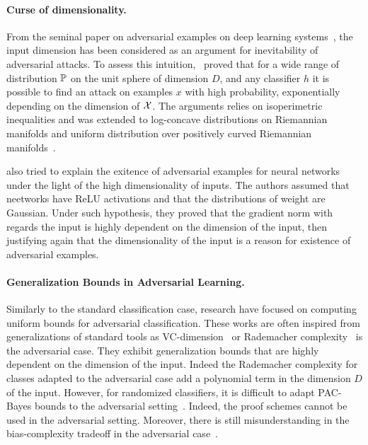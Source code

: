 \paragraph{Curse of dimensionality.} From the seminal paper on adversarial examples on deep learning systems~\citep{Szegedy2013IntriguingPO}, the input dimension has been considered as an argument for inevitability of adversarial attacks. To assess this intuition,~\citet{gilmer2018adversarial,shafahi2018adversarial} proved that for a wide range of distribution $\mathbb{P}$ on the unit sphere of dimension $D$, and any classifier $h$ it is possible to find an attack on examples $x$ with high probability, exponentially depending on the dimension of $\mathcal{X}$. The arguments relies on isoperimetric inequalities and was extended to log-concave distributions on Riemannian manifolds and uniform distribution over positively curved Riemannian manifolds~\citep{pmlr-v97-dohmatob19a}. 

\cite{simon2019first} also tried to explain the exitence of adversarial examples for neural networks under the light of the high dimensionality of inputs. The authors assumed that neetworks have ReLU activations and that the distributions of weight are Gaussian. Under such hypothesis, they proved that the gradient norm with regards the input is highly dependent on the dimension of the input, then justifying again that the dimensionality of the input is a reason for existence of adversarial examples. 




\paragraph{Generalization Bounds in Adversarial Learning.} Similarly to the standard classification case, research have focused on computing uniform bounds for adversarial classification. These works are often inspired from generalizations of standard tools as VC-dimension~\citep{cullina2018pac} or Rademacher complexity~\citep{yin2019rademacher,khim2018adversarial,awasthi2020adversarial} is the adversarial case. They exhibit generalization bounds that are highly dependent on the dimension of the input. Indeed the Rademacher complexity for classes adapted to the adversarial case add a polynomial term in the dimension $D$ of the input. However, for randomized classifiers, it is difficult to adapt PAC-Bayes bounds to the adversarial setting~\citep{viallard2021pac}. Indeed, the proof schemes cannot be used in the adversarial setting. Moreover, there is still misunderstanding in the bias-complexity tradeoff in the adversarial case~\citep{wang2018analyzing}. 


